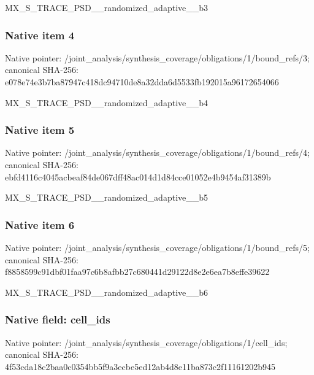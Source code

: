 \documentclass[10pt,a4paper]{article}
\begin{document}
\begingroup\raggedright\sloppy MX\_\allowbreak{}S\_\allowbreak{}TRACE\_\allowbreak{}PSD\_\allowbreak{}\_\allowbreak{}randomized\_\allowbreak{}adaptive\_\allowbreak{}\_\allowbreak{}b3\par\endgroup

\subsubsection{Native item 4}
Native pointer: /joint\_\allowbreak{}analysis/synthesis\_\allowbreak{}coverage/obligations/1/bound\_\allowbreak{}refs/3; canonical SHA-256: e078e74e3b7ba87947c418dc94710de8a32dda6d5533fb192015a96172654066

\begingroup\raggedright\sloppy MX\_\allowbreak{}S\_\allowbreak{}TRACE\_\allowbreak{}PSD\_\allowbreak{}\_\allowbreak{}randomized\_\allowbreak{}adaptive\_\allowbreak{}\_\allowbreak{}b4\par\endgroup

\subsubsection{Native item 5}
Native pointer: /joint\_\allowbreak{}analysis/synthesis\_\allowbreak{}coverage/obligations/1/bound\_\allowbreak{}refs/4; canonical SHA-256: ebfd4116c4045acbeaf84de067dff48ac014d1d84cce01052e4b9454af31389b

\begingroup\raggedright\sloppy MX\_\allowbreak{}S\_\allowbreak{}TRACE\_\allowbreak{}PSD\_\allowbreak{}\_\allowbreak{}randomized\_\allowbreak{}adaptive\_\allowbreak{}\_\allowbreak{}b5\par\endgroup

\subsubsection{Native item 6}
Native pointer: /joint\_\allowbreak{}analysis/synthesis\_\allowbreak{}coverage/obligations/1/bound\_\allowbreak{}refs/5; canonical SHA-256: f8858599c91dbf01faa97c6b8afbb27c680441d29122d8e2e6ea7b8effe39622

\begingroup\raggedright\sloppy MX\_\allowbreak{}S\_\allowbreak{}TRACE\_\allowbreak{}PSD\_\allowbreak{}\_\allowbreak{}randomized\_\allowbreak{}adaptive\_\allowbreak{}\_\allowbreak{}b6\par\endgroup

\subsubsection{Native field: cell\_\allowbreak{}ids}
Native pointer: /joint\_\allowbreak{}analysis/synthesis\_\allowbreak{}coverage/obligations/1/cell\_\allowbreak{}ids; canonical SHA-256: 4f53cda18c2baa0c0354bb5f9a3ecbe5ed12ab4d8e11ba873c2f11161202b945
\end{document}
